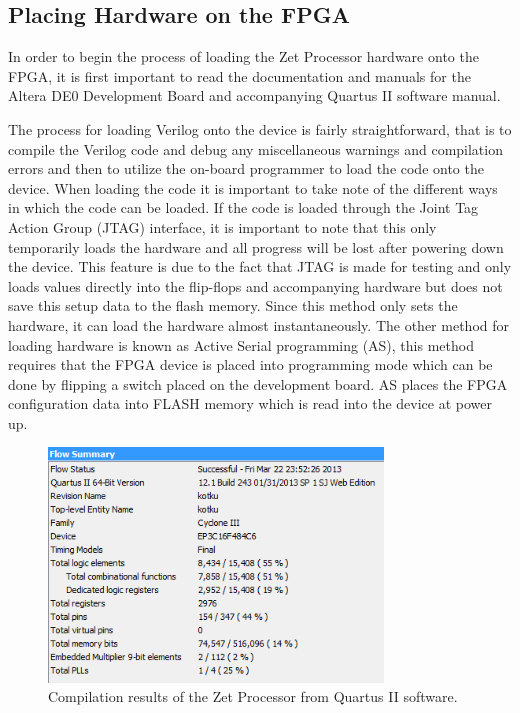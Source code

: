 \documentclass[pdftex,10.5pt]{report}
\begin{document}
\subsection{Placing Hardware on the FPGA}
In order to begin the process of loading the Zet Processor hardware onto the FPGA, it is first important to read the documentation and manuals for the Altera DE0 Development Board and accompanying Quartus II software manual. 

The process for loading Verilog onto the device is fairly straightforward, that is to compile the Verilog code and debug any miscellaneous warnings and compilation errors and then to utilize the on-board programmer to load the code onto the device. When loading the code it is important to take note of the different ways in which the code can be loaded. If the code is loaded through the Joint Tag Action Group (JTAG) interface, it is important to note that this only temporarily loads the hardware and all progress will be lost after powering down the device. This feature is due to the fact that JTAG is made for testing and only loads values directly into the flip-flops and accompanying hardware but does not save this setup data to the flash memory. Since this method only sets the hardware, it can load the hardware almost instantaneously. The other method for loading hardware is known as Active Serial programming (AS), this method requires that the FPGA device is placed into programming mode which can be done by flipping a switch placed on the development board. AS places the FPGA configuration data into FLASH memory which is read into the device at power up.

\begin{figure}[!h]
	\centering
	\includegraphics[width=3.5in]{figures/CompileResults.png}
	\caption{Compilation results of the Zet Processor from Quartus II software.}
	\label{fig:CompileResults}
\end{figure}
\end{document}
